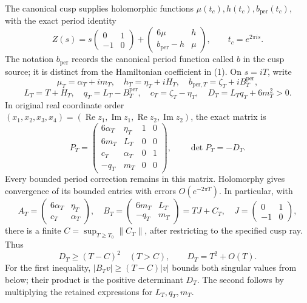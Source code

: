 \documentclass[
  11pt,
]{article}
\begin{document}
The canonical cusp supplies holomorphic functions
\(\mu(t_c),h(t_c),b_{\mathrm{per}}(t_c)\), with the exact period
identity \[
 Z(s)=s\begin{pmatrix}0&1\\-1&0\end{pmatrix}
 +\begin{pmatrix}6\mu&h\\b_{\mathrm{per}}-h&\mu\end{pmatrix},
 \qquad t_c=e^{2\pi i s}.
\] The notation \(b_{\mathrm{per}}\) records the canonical period
function called \(b\) in the cusp source; it is distinct from the
Hamiltonian coefficient in (1). On \(s=iT\), write \[
 \mu_T=\alpha_T+im_T,\quad h_T=\eta_T+iH_T,
 \quad b_{\mathrm{per},T}=\zeta_T+iB_T^{\mathrm{per}},
\] \[
 L_T=T+H_T,\quad q_T=L_T-B_T^{\mathrm{per}},\quad
 c_T=\zeta_T-\eta_T,\quad D_T=L_Tq_T+6m_T^2>0.
\] In original real coordinate order
\((x_1,x_2,x_3,x_4)=(\operatorname{Re}z_1,\operatorname{Im}z_1,\operatorname{Re}z_2,\operatorname{Im}z_2)\),
the exact matrix is \[
 P_T=\begin{pmatrix}
 6\alpha_T&\eta_T&1&0\\6m_T&L_T&0&0\\
 c_T&\alpha_T&0&1\\-q_T&m_T&0&0
 \end{pmatrix},\qquad \det P_T=-D_T.
\tag{3}
\] Every bounded period correction remains in this matrix. Holomorphy
gives convergence of its bounded entries with errors \(O(e^{-2\pi T})\).
In particular, with \[
 A_T=\begin{pmatrix}6\alpha_T&\eta_T\\c_T&\alpha_T\end{pmatrix},
 \quad B_T=\begin{pmatrix}6m_T&L_T\\-q_T&m_T\end{pmatrix}
 =TJ+C_T,\quad J=\begin{pmatrix}0&1\\-1&0\end{pmatrix},
\] there is a finite \(C=\sup_{T\ge T_0}\|C_T\|\), after restricting to
the specified cusp ray. Thus \[
 D_T\ge(T-C)^2\quad(T>C),\qquad D_T=T^2+O(T).
\tag{4}
\] For the first inequality, \(|B_Tv|\ge(T-C)|v|\) bounds both singular
values from below; their product is the positive determinant \(D_T\).
The second follows by multiplying the retained expressions for
\(L_T,q_T,m_T\).
\end{document}
